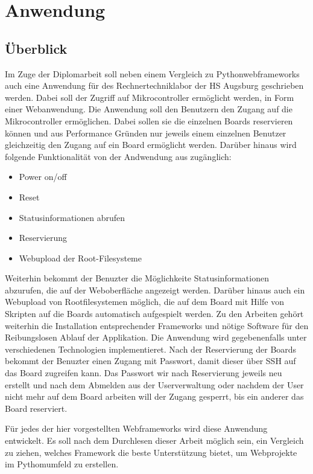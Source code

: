 \chapter{Anwendung}
\section{Überblick}
Im Zuge der Diplomarbeit soll neben einem Vergleich zu Pythonwebframeworks auch
eine Anwendung für des Rechnertechniklabor der HS Augsburg geschrieben werden.
Dabei soll der Zugriff auf Mikrocontroller ermöglicht werden, in Form einer
Webanwendung. Die Anwendung soll den Benutzern den Zugang auf die
Mikrocontroller ermöglichen. Dabei sollen sie die einzelnen Boards reservieren
können und aus Performance Gründen nur jeweils einem einzelnen Benutzer
gleichzeitig den Zugang auf ein Board ermöglicht werden. Darüber hinaus wird
folgende Funktionalität von der Andwendung aus zugänglich:

\begin{itemize}
  \item Power on/off
  \item Reset
  \item Statusinformationen abrufen
  \item Reservierung
  \item Webupload der Root-Filesysteme
\end{itemize}

Weiterhin bekommt der Benuzter die Möglichkeite Statusinformationen abzurufen, 
die auf der Weboberfläche angezeigt werden. Darüber hinaus auch ein Webupload
von Rootfilesystemen möglich, die auf dem Board mit Hilfe von Skripten auf die
Boards automatisch aufgespielt werden. Zu den Arbeiten gehört weiterhin die
Installation entsprechender Frameworks und nötige Software für den
Reibungslosen Ablauf der Applikation. Die Anwendung wird gegebenenfalls unter
verschiedenen Technologien implementieret. Nach der Reservierung der Boards
bekommt der Benuzter einen Zugang mit Passwort, damit dieser über SSH auf das
Board zugreifen kann. Das Passwort wir nach Reservierung jeweils neu erstellt
und nach dem Abmelden aus der Userverwaltung oder nachdem der User nicht mehr
auf dem Board arbeiten will der Zugang gesperrt, bis ein anderer das Board
reserviert. 

Für jedes der hier vorgestellten Webframeworks wird diese Anwendung entwickelt.
Es soll nach dem Durchlesen dieser Arbeit möglich sein, ein Vergleich zu ziehen,
welches Framework die beste Unterstützung bietet, um Webprojekte im
Pythomumfeld zu erstellen.
